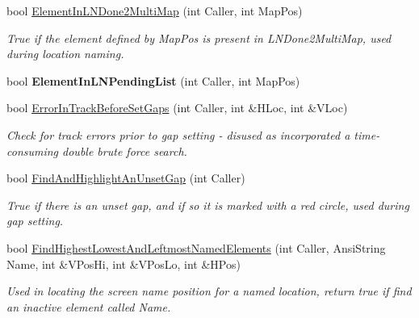 \begin{DoxyCompactItemize}
\item 
\mbox{\label{class_t_track_a35cb615d02e6e4debe2fb2b764adc058}} 
bool \mbox{\hyperlink{class_t_track_a35cb615d02e6e4debe2fb2b764adc058}{Element\+In\+L\+N\+Done2\+Multi\+Map}} (int Caller, int Map\+Pos)
\begin{DoxyCompactList}\small\item\em True if the element defined by Map\+Pos is present in L\+N\+Done2\+Multi\+Map, used during location naming. \end{DoxyCompactList}\item 
\mbox{\label{class_t_track_a977285544a4e0b017ed5c9670ac38d87}} 
bool {\bfseries Element\+In\+L\+N\+Pending\+List} (int Caller, int Map\+Pos)
\item 
\mbox{\label{class_t_track_a110a199a0c3fd6d2b8fa1cebc0a0a4ed}} 
bool \mbox{\hyperlink{class_t_track_a110a199a0c3fd6d2b8fa1cebc0a0a4ed}{Error\+In\+Track\+Before\+Set\+Gaps}} (int Caller, int \&H\+Loc, int \&V\+Loc)
\begin{DoxyCompactList}\small\item\em Check for track errors prior to gap setting -\/ disused as incorporated a time-\/consuming double brute force search. \end{DoxyCompactList}\item 
\mbox{\label{class_t_track_a411cfd944b75372ae56937d69fb8b1c5}} 
bool \mbox{\hyperlink{class_t_track_a411cfd944b75372ae56937d69fb8b1c5}{Find\+And\+Highlight\+An\+Unset\+Gap}} (int Caller)
\begin{DoxyCompactList}\small\item\em True if there is an unset gap, and if so it is marked with a red circle, used during gap setting. \end{DoxyCompactList}\item 
\mbox{\label{class_t_track_aabdf6becaf1d21cc5c654293cc3fc734}} 
bool \mbox{\hyperlink{class_t_track_aabdf6becaf1d21cc5c654293cc3fc734}{Find\+Highest\+Lowest\+And\+Leftmost\+Named\+Elements}} (int Caller, Ansi\+String Name, int \&V\+Pos\+Hi, int \&V\+Pos\+Lo, int \&H\+Pos)
\begin{DoxyCompactList}\small\item\em Used in locating the screen name position for a named location, return true if find an inactive element called \textquotesingle{}Name\textquotesingle{}. \end{DoxyCompactList}\item 

\end{DoxyCompactItemize}
